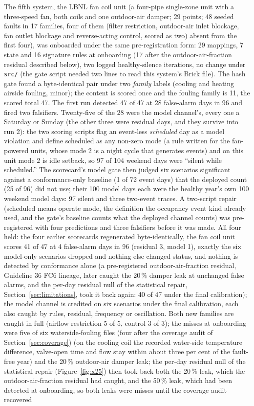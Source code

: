 \documentclass[11pt,letterpaper]{article}
\begin{document}
The fifth system, the LBNL fan coil unit (a four-pipe single-zone unit with a three-speed fan, both coils and one outdoor-air damper; 29 points; 48 seeded faults in 17 families, four of them (filter restriction, outdoor-air inlet blockage, fan outlet blockage and reverse-acting control, scored as two) absent from the first four), was onboarded under the same pre-registration form: 29 mappings, 7 state and 16 signature rules at onboarding (17 after the outdoor-air-fraction residual described below), two logged healthy-silence iterations, no change under \texttt{src/} (the gate script needed two lines to read this system's Brick file). The hash gate found a byte-identical pair under two \emph{family} labels (cooling and heating airside fouling, minor); the content is scored once and the fouling family is 11, the scored total 47. The first run detected 47 of 47 at 28 false-alarm days in 96 and fired two falsifiers. Twenty-five of the 28 were the model channel's, every one a Saturday or Sunday (the other three were residual days, and they survive into run 2): the two scoring scripts flag an event-less \emph{scheduled} day as a model violation and define scheduled as any non-zero mode (a rule written for the fan-powered units, whose mode 2 is a night cycle that generates events) and on this unit mode 2 is idle setback, so 97 of 104 weekend days were ``silent while scheduled.'' The scorecard's model gate then judged six scenarios significant against a conformance-only baseline (1 of 72 event days) that the deployed count (25 of 96) did not use; their 100 model days each were the healthy year's own 100 weekend model days: 97 silent and three two-event traces. A two-script repair (scheduled means operate mode, the definition the occupancy event kind already used, and the gate's baseline counts what the deployed channel counts) was pre-registered with four predictions and three falsifiers before it was made. All four held: the four earlier scorecards regenerated byte-identically, the fan coil unit scores 41 of 47 at 4 false-alarm days in 96 (residual 3, model 1), exactly the six model-only scenarios dropped and nothing else changed status, and nothing is detected by conformance alone (a pre-registered outdoor-air-fraction residual, Guideline 36 FC6 lineage, later caught the 20\,\% damper leak at unchanged false alarms, and the per-day residual null of the statistical repair, Section~\ref{sec:limitations}, took it back again: 40 of 47 under the final calibration); the model channel is credited on six scenarios under the final calibration, each also caught by rules, residual, frequency or oscillation. Both new families are caught in full (airflow restriction 5 of 5, control 3 of 3); the misses at onboarding were five of six waterside-fouling files (four after the coverage audit of Section~\ref{sec:coverage}) (on the cooling coil the recorded water-side temperature difference, valve-open time and flow stay within about three per cent of the fault-free year) and the 20\,\% outdoor-air damper leak; the per-day residual null of the statistical repair (Figure~\ref{fig:x25}) then took back both the 20\,\% leak, which the outdoor-air-fraction residual had caught, and the 50\,\% leak, which had been detected at onboarding, so both leaks were misses until the coverage audit recovered 
\end{document}
